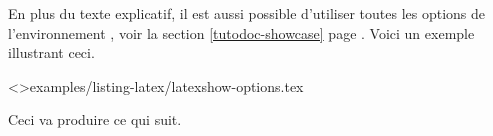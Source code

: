 \documentclass{../main/main}
\begin{document}
\begin{tdocexa}
    En plus du texte explicatif, il est aussi possible d'utiliser toutes les options de l'environnement , voir la section \ref{tutodoc-showcase} page \pageref{tutodoc-showcase}.
    Voici un exemple illustrant ceci.

    \medskip

    \tdoclatexinput<>{examples/listing-latex/latexshow-options.tex}

    \smallskip

    Ceci va produire ce qui suit.

    \smallskip

    
\end{tdocexa}
\end{document}
